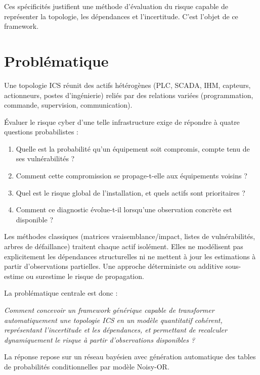 \documentclass[12pt,a4paper]{article}
\newcommand{\forcereset}[1]{}
\begin{document}
Ces spécificités justifient une méthode d'évaluation du risque capable de représenter la topologie, les dépendances et l'incertitude. C'est l'objet de ce framework.

\section{Problématique}
\forcereset{6}

Une topologie ICS réunit des actifs hétérogènes (PLC, SCADA, IHM, capteurs, actionneurs, postes d'ingénierie) reliés par des relations variées (programmation, commande, supervision, communication).

Évaluer le risque cyber d'une telle infrastructure exige de répondre à quatre questions probabilistes :
\begin{enumerate}
    \item Quelle est la probabilité qu'un équipement soit compromis, compte tenu de ses vulnérabilités ?
    \item Comment cette compromission se propage-t-elle aux équipements voisins ?
    \item Quel est le risque global de l'installation, et quels actifs sont prioritaires ?
    \item Comment ce diagnostic évolue-t-il lorsqu'une observation concrète est disponible ?
\end{enumerate}

Les méthodes classiques (matrices vraisemblance/impact, listes de vulnérabilités, arbres de défaillance) traitent chaque actif isolément. Elles ne modélisent pas explicitement les dépendances structurelles ni ne mettent à jour les estimations à partir d'observations partielles. Une approche déterministe ou additive sous-estime ou surestime le risque de propagation.

La problématique centrale est donc :

\begin{center}
    \emph{Comment concevoir un framework générique capable de transformer automatiquement une topologie ICS en un modèle quantitatif cohérent, représentant l'incertitude et les dépendances, et permettant de recalculer dynamiquement le risque à partir d'observations disponibles ?}
\end{center}

La réponse repose sur un réseau bayésien avec génération automatique des tables de probabilités conditionnelles par modèle Noisy-OR.
\end{document}
